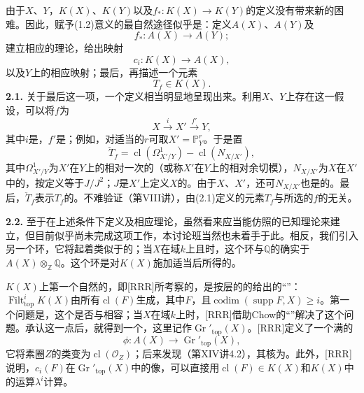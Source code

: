 由于$X$、$Y$，$K(X)$、$K(Y)$以及$f_*:K(X)\longrightarrow K(Y)$的定义没有带来新的困难。因此，赋予(1.2)意义的最自然途径似乎是：定义$A(X)$、$A(Y)$及
\[f_*:A(X)\longrightarrow A(Y);\]
建立相应的理论，给出映射
\[c_i:K(X)\longrightarrow A(X),\]
以及$Y$上的相应映射；最后，再描述一个元素
\[T_f\in K(X).\]
\textbf{2.1.} 关于最后这一项，一个定义相当明显地呈现出来。利用$X$、$Y$上存在这一假设，可以将$f$为
\[X\xrightarrow{i}X'\xrightarrow{f'}Y,\tag{2.1}\]
其中$i$是，$f'$是；例如，对适当的$r$可取$X'=\mathbb P^r_Y$。于是置
\[\check T_f=\operatorname{cl}(\Omega^1_{X'/Y})-\operatorname{cl}(N_{X/X'}),\tag{2.2}\]
其中$\Omega^1_{X'/Y}$为$X'$在$Y$上的相对一次的（或称$X'$在$Y$上的相对余切模），$N_{X/X'}$为$X$在$X'$中的，按定义等于$J/J^2$；$J$是$X'$上定义$X$的。由于$X$、$X'$，还可$N_{X/X'}$也是的。最后，$\check T_f$表示$T_f$的。不难验证（第VIII讲），由(2.1)定义的元素$T_f$与所选的$f$的无关。

\textbf{2.2.} 至于在上述条件下定义及相应理论，虽然看来应当能仿照的已知理论来建立，但目前似乎尚未完成这项工作，本讨论班当然也未着手于此。相反，我们引入另一个环，它将起着类似于的；当$X$在域$k$上且时，这个环与$\mathbb Q$的确实于$A(X)\otimes_{\mathbb Z}\mathbb Q$。这个环是对$K(X)$施加适当后所得的。

$K(X)$上第一个自然的，即[RRR]所考察的，是按层的的给出的“”：$\operatorname{Filt}^i_{\mathrm{top}}K(X)$由所有$\operatorname{cl}(F)$生成，其中$F$，且$\operatorname{codim}(\operatorname{supp}F,X)\geq i$。第一个问题是，这个是否与相容；当$X$在域$k$上时，[RRR]借助Chow的“”解决了这个问题。承认这一点后，就得到一个，这里记作$\operatorname{Gr}'_{\mathrm{top}}(X)$。[RRR]定义了一个满的
\[\phi:A(X)\longrightarrow\operatorname{Gr}'_{\mathrm{top}}(X),\]
它将素圈$Z$的类变为$\operatorname{cl}(\mathcal O_Z)$；后来发现（第XIV讲4.2），其核为。此外，[RRR]说明，$c_i(F)$在$\operatorname{Gr}'_{\mathrm{top}}(X)$中的像，可以直接用$\operatorname{cl}(F)\in K(X)$和$K(X)$中的运算$\lambda^i$计算。

